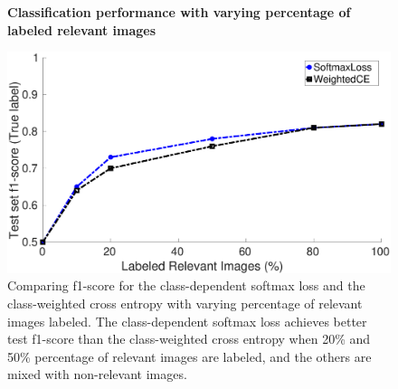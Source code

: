 
\begin{figure}[t]
\centering
\textbf{Classification performance with varying percentage of labeled relevant images}\par\medskip
\centering
   \includegraphics[width=1.05\linewidth]{img/pu_vs_pn}
\caption{
Comparing f1-score for the class-dependent softmax loss and the class-weighted cross entropy with varying percentage of relevant images labeled.
The class-dependent softmax loss achieves better test f1-score than the class-weighted cross entropy when 20\% and 50\% percentage of relevant images are labeled, and the others are mixed with non-relevant images.
}
\label{fig:pct_annotating}
\end{figure}



